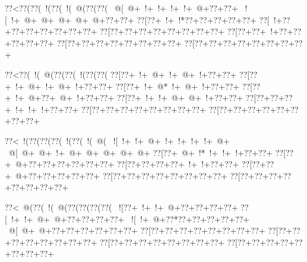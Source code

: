 \vbox{\vbox{\goo
\hbox{\0??<\0??(\0??(\- !(\0??(\- !(\- @(\0??(\0??(}
\hbox{\- @[\- @+\- !+\- !+\- !+\- !+\- @+\0??+\0??+}
\hbox{\- ![\- !+\- @+\- @+\- @+\- @+\- @+\0??+\0??+}
\hbox{\0??[\0??+\- !+\- !*\0??+\0??+\0??+\0??+\0??+}
\hbox{\0??[\- !+\0??+\0??+\0??+\0??+\0??+\0??+\0??+}
\hbox{\0??[\0??+\0??+\0??+\0??+\0??+\0??+\0??+\0??+}
\hbox{\0??[\0??+\0??+\- !+\0??+\0??+\0??+\0??+\0??+}
\hbox{\0??[\0??+\0??+\0??+\0??+\0??+\0??+\0??+\0??+}
\hbox{\0??[\0??+\0??+\0??+\0??+\0??+\0??+\0??+\0??+}
\smallskip
}
}
\hfil\break


\vbox{\vbox{\goo
\hbox{\0??<\0??(\- !(\- @(\0??(\0??(\- !(\0??(\0??(}
\hbox{\0??[\0??+\- !+\- @+\- !+\- @+\- !+\0??+\0??+}
\hbox{\0??[\0??+\- !+\- @+\- !+\- @+\- !+\0??+\0??+}
\hbox{\0??[\0??+\- !+\- @*\- !+\- @+\- !+\0??+\0??+}
\hbox{\0??[\0??+\- !+\- @+\0??+\- @+\- !+\0??+\0??+}
\hbox{\0??[\0??+\- !+\- !+\- @+\- @+\- !+\0??+\0??+}
\hbox{\0??[\0??+\0??+\0??+\- !+\- !+\- !+\0??+\0??+}
\hbox{\0??[\0??+\0??+\0??+\0??+\0??+\0??+\0??+\0??+}
\hbox{\0??[\0??+\0??+\0??+\0??+\0??+\0??+\0??+\0??+}
\smallskip
}
}
\hfil\break


\vbox{\vbox{\goo
\hbox{\0??<\- !(\0??(\0??(\0??(\- !(\0??(\- !(\- @(}
\hbox{\- ![\- !+\- !+\- @+\- !+\- !+\- !+\- !+\- @+}
\hbox{\- @[\- @+\- @+\- !+\- @+\- @+\- @+\- @+\- @+}
\hbox{\0??[\0??+\- @+\- !*\- !+\- !+\- !+\0??+\0??+}
\hbox{\0??[\0??+\- @+\0??+\0??+\0??+\0??+\0??+\0??+}
\hbox{\0??[\0??+\0??+\0??+\0??+\- !+\- !+\0??+\0??+}
\hbox{\0??[\0??+\0??+\- @+\0??+\0??+\0??+\0??+\0??+}
\hbox{\0??[\0??+\0??+\0??+\0??+\0??+\0??+\0??+\0??+}
\hbox{\0??[\0??+\0??+\0??+\0??+\0??+\0??+\0??+\0??+}
\smallskip
}
}
\hfil\break


\vbox{\vbox{\goo
\hbox{\0??<\- @(\0??(\- !(\- @(\0??(\0??(\0??(\0??(}
\hbox{\- ![\0??+\- !+\- !+\- @+\0??+\0??+\0??+\0??+}
\hbox{\0??[\- !+\- !+\- @+\- @+\0??+\0??+\0??+\0??+}
\hbox{\- ![\- !+\- @+\0??*\0??+\0??+\0??+\0??+\0??+}
\hbox{\- @[\- @+\- @+\0??+\0??+\0??+\0??+\0??+\0??+}
\hbox{\0??[\0??+\0??+\0??+\0??+\0??+\0??+\0??+\0??+}
\hbox{\0??[\0??+\0??+\0??+\0??+\0??+\0??+\0??+\0??+}
\hbox{\0??[\0??+\0??+\0??+\0??+\0??+\0??+\0??+\0??+}
\hbox{\0??[\0??+\0??+\0??+\0??+\0??+\0??+\0??+\0??+}
\smallskip
}
}
\hfil\break


